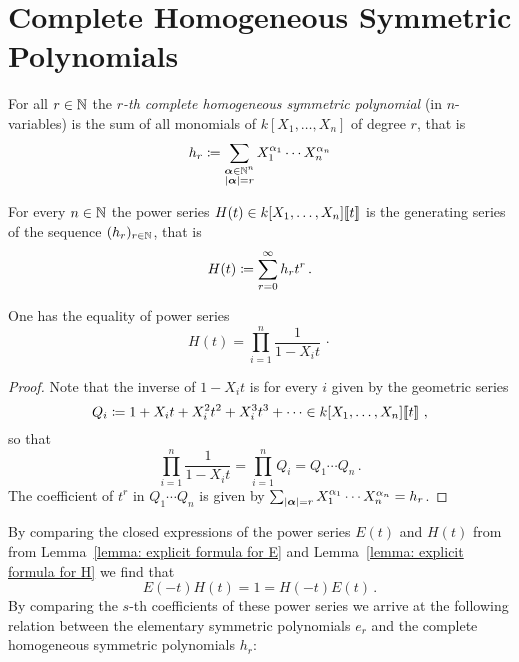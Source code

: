 \section{Complete Homogeneous Symmetric Polynomials}


\begin{definition}
  For all $r \in \mathbb{N}$ the \emph{$r$-th complete homogeneous symmetric polynomial} (in $n$-variables) is the sum of all monomials of $k[X_1, \dotsc, X_n]$ of degree $r$, that is
  \[
              h_r
    \coloneqq  \sum_{\substack{\bm{\alpha} \in \mathbb{N}^n \\ |\bm{\alpha}| = r}}
              X_1^{\alpha_1} \dotsm X_n^{\alpha_n}
  \]
\end{definition}


\begin{definition}
  For every $n \in \mathbb{N}$ the power series $H(t) \in k[X_1, \dotsc, X_n]\!\left[\!\left[t\right]\!\right]$ is the generating series of the sequence $(h_r)_{r \in \mathbb{N}}$, that is
  \[
              H(t)
    \coloneqq  \sum_{r=0}^\infty h_r t^r \,.
  \]
\end{definition}


\begin{lemma}
  \label{lemma: explicit formula for H}
  One has the equality of power series
  \[
      H(t)
    = \prod_{i=1}^n \frac{1}{1 - X_i t} \,\cdotp
  \]
\end{lemma}


\begin{proof}
  Note that the inverse of $1 - X_i t$ is for every $i$ given by the geometric series
  \[
              Q_i
    \coloneqq  1 + X_i t + X_i^2 t^2 + X_i^3 t^3 + \dotsb
    \in       k[X_1, \dotsc, X_n]\!\left[\!\left[t\right]\!\right] \,,
  \]
  so that
  \[
      \prod_{i=1}^n \frac{1}{1 - X_i t}
    = \prod_{i=1}^n Q_i
    = Q_1 \dotsb Q_n \,.
  \]
  The coefficient of $t^r$ in $Q_1 \dotsm Q_n$ is given by $\sum_{|\bm{\alpha}| = r}  X_1^{\alpha_1} \dotsm X_n^{\alpha_n} = h_r$.
\end{proof}


\begin{fluff}
  By comparing the closed expressions of the power series $E(t)$ and $H(t)$ from from Lemma~\ref{lemma: explicit formula for E} and Lemma~\ref{lemma: explicit formula for H} we find that
  \[
      E(-t)H(t)
    = 1
    = H(-t)E(t) \,.
  \]
  By comparing the $s$-th coefficients of these power series we arrive at the following relation between the elementary symmetric polynomials $e_r$ and the complete homogeneous symmetric polynomials $h_r$:
\end{fluff}


